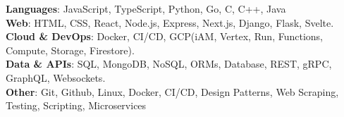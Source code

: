 \textbf{Languages}{: JavaScript, TypeScript, Python, Go, C, C++, Java} \\ \vspace{0.2 cm}
\textbf{Web}{:  HTML, CSS, React, Node.js, Express, Next.js, Django, Flask, Svelte.} \\ \vspace{0.2 cm}
\textbf{Cloud \& DevOps}{: Docker, CI/CD, GCP(iAM, Vertex, Run, Functions, Compute, Storage, Firestore).} \\ \vspace{0.2 cm}
\textbf{Data \& APIs}{: SQL, MongoDB, NoSQL, ORMs, Database, REST, gRPC, GraphQL, Websockets.} \\ \vspace{0.2 cm}
\textbf{Other}{: Git, Github, Linux, Docker, CI/CD, Design Patterns, Web Scraping, Testing, Scripting, Microservices} \\ \vspace{0.2 cm}

